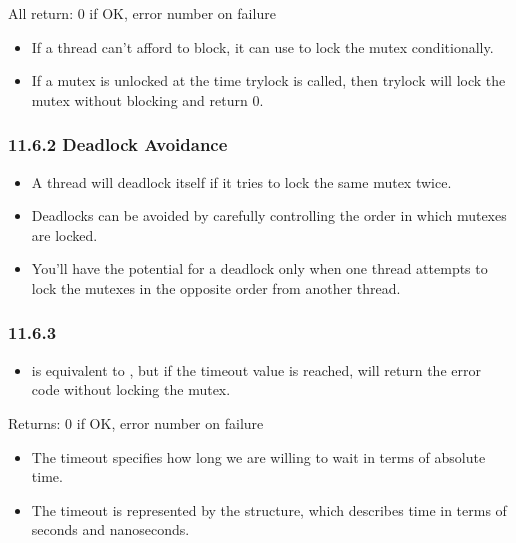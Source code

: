 \documentclass[]{article}
\begin{document}

All return: 0 if OK, error number on failure

\begin{itemize}
\item If a thread can't afford to block, it can use
 to lock the mutex conditionally.
\item If a mutex is unlocked at the time trylock is called, then trylock will
lock the mutex without blocking and return 0.
\end{itemize}

\subsubsection*{11.6.2 Deadlock Avoidance}
\begin{itemize}
\item A thread will deadlock itself if it tries to lock the same mutex twice.
\item Deadlocks can be avoided by carefully controlling the order in which
mutexes are locked.
\item You'll have the potential for a deadlock only when one thread attempts to
lock the mutexes in the opposite order from another thread.
\end{itemize}

\subsubsection*{11.6.3 }
\begin{itemize}
\item {} is equivalent to
, but if the timeout value is reached,
 will return the error code 
without locking the mutex.
\end{itemize}




Returns: 0 if OK, error number on failure

\begin{itemize}
\item The timeout specifies how long we are willing to wait in terms of absolute
time.
\item The timeout is represented by the  structure, which
describes time in terms of seconds and nanoseconds.
\end{itemize}
\end{document}
